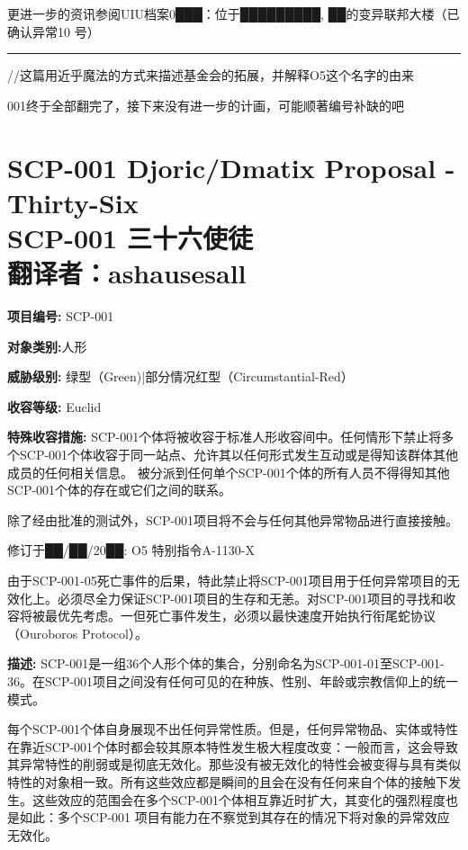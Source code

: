 \documentclass[openany,a4paper]{book} %
\newcounter{mychapter} %
\begin{document}
更进一步的资讯参阅UIU档案0███：位于█████████, ██的变异联邦大楼（已确认异常10 号）\vspace{2pt}

\hrule\vspace{12pt}

//这篇用近乎魔法的方式来描述基金会的拓展，并解释O5这个名字的由来

001终于全部翻完了，接下来没有进一步的计画，可能顺著编号补缺的吧
\addtocounter{mychapter}{1}
\chapter[SCP-001 三十六使徒]{SCP-001 Djoric/Dmatix Proposal - Thirty-Six \\ SCP-001 三十六使徒 \\ 翻译者：ashausesall}\label{chap:SCP-001-10}
\textbf{项目编号:} SCP-001\vspace{12pt}

\textbf{对象类别:}人形\vspace{12pt}

\textbf{威胁级别:} 绿型（Green)|部分情况红型（Circumstantial-Red）\vspace{12pt}

\textbf{收容等级:} Euclid\vspace{12pt}

\textbf{特殊收容措施: }SCP-001个体将被收容于标准人形收容间中。任何情形下禁止将多个SCP-001个体收容于同一站点、允许其以任何形式发生互动或是得知该群体其他成员的任何相关信息。 被分派到任何单个SCP-001个体的所有人员不得得知其他SCP-001个体的存在或它们之间的联系。

除了经由批准的测试外，SCP-001项目将不会与任何其他异常物品进行直接接触。\vspace{12pt}

修订于██/██/20██: O5 特别指令A-1130-X

由于SCP-001-05死亡事件的后果，特此禁止将SCP-001项目用于任何异常项目的无效化上。必须尽全力保证SCP-001项目的生存和无恙。对SCP-001项目的寻找和收容将被最优先考虑。一但死亡事件发生，必须以最快速度开始执行衔尾蛇协议（Ouroboros Protocol）。\vspace{12pt}

\textbf{描述: }SCP-001是一组36个人形个体的集合，分别命名为SCP-001-01至SCP-001-36。在SCP-001项目之间没有任何可见的在种族、性别、年龄或宗教信仰上的统一模式。\vspace{20pt}

每个SCP-001个体自身展现不出任何异常性质。但是，任何异常物品、实体或特性在靠近SCP-001个体时都会较其原本特性发生极大程度改变：一般而言，这会导致其异常特性的削弱或是彻底无效化。那些没有被无效化的特性会被变得与具有类似特性的对象相一致。所有这些效应都是瞬间的且会在没有任何来自个体的接触下发生。这些效应的范围会在多个SCP-001个体相互靠近时扩大，其变化的强烈程度也是如此：多个SCP-001 项目有能力在不察觉到其存在的情况下将对象的异常效应无效化。\vspace{20pt}
\end{document}
